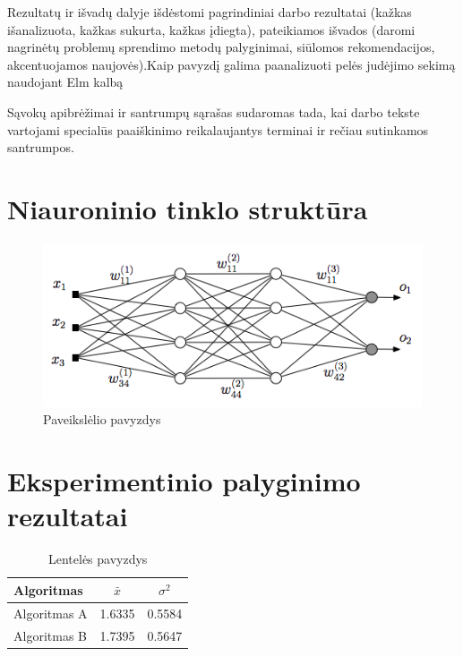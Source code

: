 \documentclass{VUMIFPSmagistrinis}
\begin{document}
Rezultatų ir išvadų dalyje išdėstomi pagrindiniai darbo rezultatai (kažkas
išanalizuota, kažkas sukurta, kažkas įdiegta), pateikiamos išvados (daromi
nagrinėtų problemų sprendimo metodų palyginimai, siūlomos rekomendacijos,
akcentuojamos naujovės).Kaip pavyzdį galima paanalizuoti pelės judėjimo sekimą naudojant Elm kalbą

\printbibliography[heading=bibintoc]  %

Sąvokų apibrėžimai ir santrumpų sąrašas sudaromas tada, kai darbo tekste
vartojami specialūs paaiškinimo reikalaujantys terminai ir rečiau sutinkamos
santrumpos.

\appendix  %

\section{Niauroninio tinklo struktūra}
\begin{figure}[H]
    \centering
    \includegraphics[scale=0.5]{img/MLP}
    \caption{Paveikslėlio pavyzdys}
    \label{img:mlp}
\end{figure}


\section{Eksperimentinio palyginimo rezultatai}
\begin{table}[H]\footnotesize
  \centering
  \caption{Lentelės pavyzdys}
  {\begin{tabular}{|l|c|c|} \hline
    Algoritmas & $\bar{x}$ & $\sigma^{2}$ \\
    \hline
    Algoritmas A  & 1.6335    & 0.5584       \\
    Algoritmas B  & 1.7395    & 0.5647       \\
    \hline
  \end{tabular}}
  \label{tab:table example}
\end{table}
\end{document}
